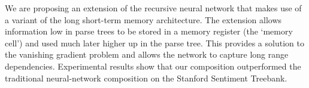 We are proposing an extension of the recursive neural network that makes use of a variant of the long short-term memory architecture. The extension allows information low in parse trees to be stored in a memory register (the `memory cell') and used much later higher up in the parse tree. This provides a solution to the vanishing gradient problem and allows the network to capture long range dependencies. Experimental results show that our composition outperformed the traditional neural-network composition on the Stanford Sentiment Treebank.
